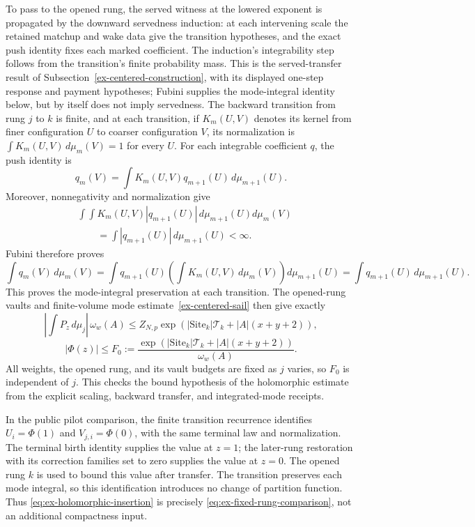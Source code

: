 To pass to the opened rung, the served witness at the lowered exponent is
propagated by the downward servedness induction: at each intervening scale
the retained matchup and wake data give the transition hypotheses, and the
exact push identity fixes each marked coefficient. The induction's
integrability step follows from the transition's finite probability mass.
This is the served-transfer result of
Subsection~\ref{ex-centered-construction}, with its displayed one-step response
and payment hypotheses; Fubini supplies the mode-integral identity below,
but by itself does not imply servedness. The backward transition from rung
$j$ to $k$ is finite, and at each transition, if $K_m(U,V)$ denotes its
kernel from finer configuration $U$ to coarser configuration $V$, its
normalization is $\int K_m(U,V)\,d\mu_m(V)=1$ for every $U$. For each
integrable coefficient $q$, the push identity is
\[
 q_m(V)=\int K_m(U,V)q_{m+1}(U)\,d\mu_{m+1}(U).
\]
Moreover, nonnegativity and normalization give
\begin{align*}
 &\int\!\int K_m(U,V)|q_{m+1}(U)|\,d\mu_{m+1}(U)d\mu_m(V)\\
 &\hspace{2em}=\int |q_{m+1}(U)|\,d\mu_{m+1}(U)<\infty.
\end{align*}
Fubini therefore proves
\[
 \int q_m(V)\,d\mu_m(V)
 =\int q_{m+1}(U)\left(\int K_m(U,V)\,d\mu_m(V)\right)d\mu_{m+1}(U)
 =\int q_{m+1}(U)\,d\mu_{m+1}(U).
\]
This proves the mode-integral preservation at each transition. The opened-rung vaults and
finite-volume mode estimate~\eqref{ex-centered-sail} then give
exactly
\[
 |\int P_z\,d\mu_j|\,\omega_w(A)
 \leq Z_{N,p}\exp(|\mathrm{Site}_k|\mathcal T_k+|A|(x+y+2)),
\]
\[
 |\Phi(z)|\leq F_0:=
 \frac{\exp(|\mathrm{Site}_k|\mathcal T_k+|A|(x+y+2))}
      {\omega_w(A)}.
\]
All weights, the opened rung, and its vault budgets are fixed as $j$ varies,
so $F_0$ is independent of $j$. This checks the bound hypothesis of the
holomorphic estimate from the explicit scaling, backward transfer, and
integrated-mode receipts.

In the public pilot comparison, the finite transition recurrence identifies
$U_i=\Phi(1)$ and $V_{j,i}=\Phi(0)$, with the same terminal law and
normalization. The terminal birth identity supplies the value at $z=1$;
the later-rung restoration with its correction families set to zero supplies
the value at $z=0$. The opened rung $k$ is used to bound this value after
transfer. The transition
preserves each mode integral, so this identification introduces no change of
partition function. Thus \eqref{eq:ex-holomorphic-insertion} is precisely
\eqref{eq:ex-fixed-rung-comparison}, not an additional compactness input.

